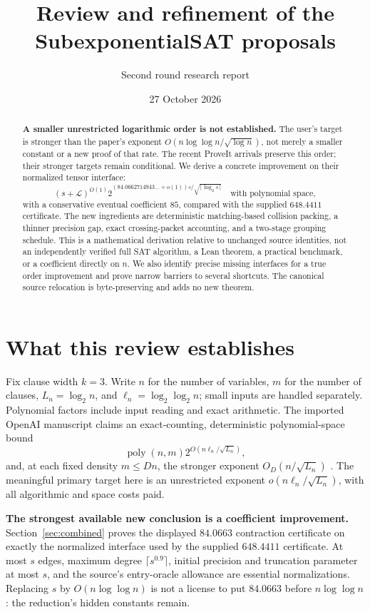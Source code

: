 \documentclass[11pt,letterpaper]{article}
\title{\vspace{-1.5em}Review and refinement of the\\SubexponentialSAT proposals}
\author{Second round research report}
\date{27 October 2026}
\newcommand{\poly}{\operatorname{poly}}
\begin{document}
\maketitle
\vspace{-1.6em}
\begin{abstract}
\noindent\textbf{A smaller unrestricted logarithmic order is not established.}
The user's target is stronger than the paper's exponent
$O(n\log\log n/\sqrt{\log n})$, not merely a smaller constant or a new proof of that rate.
The recent ProveIt arrivals preserve this order; their stronger targets remain conditional.
We derive a concrete improvement on their normalized tensor interface:
\[
 (s+\mathcal L)^{O(1)}
 2^{(84.0662714943\ldots+o(1))s/\sqrt{\lceil\log_2s\rceil}}
 \quad\text{with polynomial space},
\]
with a conservative eventual coefficient $85$, compared with the supplied $648.4411$ certificate.
The new ingredients are deterministic matching-based collision packing, a thinner precision gap,
exact crossing-packet accounting, and a two-stage grouping schedule.
This is a mathematical derivation relative to unchanged source identities, not an independently
verified full SAT algorithm, a Lean theorem, a practical benchmark, or a coefficient directly on $n$.
We also identify precise missing interfaces for a true order improvement and prove narrow barriers
to several shortcuts. The canonical source relocation is byte-preserving and adds no new theorem.
\end{abstract}

\section{What this review establishes}
Fix clause width $k=3$. Write $n$ for the number of variables, $m$ for the
number of clauses, $L_n=\log_2 n$, and $\ell_n=\log_2\log_2 n$; small inputs
are handled separately. Polynomial factors include input reading and exact arithmetic.
The imported OpenAI manuscript claims an exact-counting, deterministic polynomial-space bound
\begin{equation}\label{eq:baseline}
 \poly(n,m)2^{O(n\ell_n/\sqrt{L_n})},
\end{equation}
and, at each fixed density $m\le Dn$, the stronger exponent
$O_D(n/\sqrt{L_n})$ \cite{openai}.
The meaningful primary target here is an unrestricted exponent
$o(n\ell_n/\sqrt{L_n})$, with all algorithmic and space costs paid.

\textbf{The strongest available new conclusion is a coefficient improvement.}
Section~\ref{sec:combined} proves the displayed $84.0663$ contraction certificate on exactly the
normalized interface used by the supplied $648.4411$ certificate.
At most $s$ edges, maximum degree $\lceil s^{0.9}\rceil$, initial precision and
truncation parameter at most $s$, and the source's entry-oracle allowance are essential
normalizations. Replacing $s$ by $O(n\log\log n)$ is not a license to put $84.0663$
before $n\log\log n$: the reduction's hidden constants remain.
\end{document}
